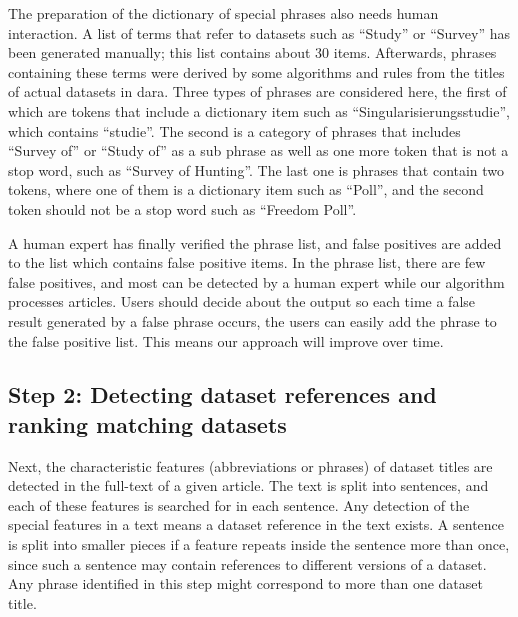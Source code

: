 \documentclass{IOS-Book-Article}
\newcommand{\dara}{\textsf{da\textbar ra}}
\begin{document}
The preparation of the dictionary of special phrases also needs human interaction.
A list of terms that refer to datasets such as \enquote{Study} or \enquote{Survey} has been generated manually; this list contains about 30 items.
Afterwards, phrases containing these terms were derived by some algorithms and rules from the titles of actual datasets in {\dara}.
Three types of phrases are considered here, the first of which are tokens that include a dictionary item such as \enquote{Singularisierungsstudie}, which contains \enquote{studie}.
The second is a category of phrases that includes \enquote{Survey of} or \enquote{Study of} as a sub phrase as well as one more token that is not a stop word, such as \enquote{Survey of Hunting}.
The last one is phrases that contain two tokens, where one of them is a dictionary item such as \enquote{Poll}, and the second token should not be a stop word such as \enquote{Freedom Poll}. 

A human expert has finally verified the phrase list, and false positives are added to the list which contains false positive items.
In the phrase list, there are few false positives, and most can be detected by a human expert
while our algorithm processes articles.
Users should decide about the output so each time a false result generated by a false phrase occurs, the users can easily add the phrase to the false positive list. This means our approach will improve over time.
 
\subsection{Step 2: Detecting dataset references and ranking matching datasets}
\label{sec:detecting-ranking}
Next, the characteristic features (abbreviations or phrases) of dataset titles are detected in the full-text of a given article.
The text is split into sentences, and each of these features is searched for in each sentence. 
Any detection of the special features in a text means a dataset reference in the text exists.
A sentence is split into smaller pieces if a feature repeats inside the sentence more than once, since such a sentence may contain references to %
different versions of a dataset.
Any phrase identified in this step might correspond to more than one dataset title.
\end{document}
